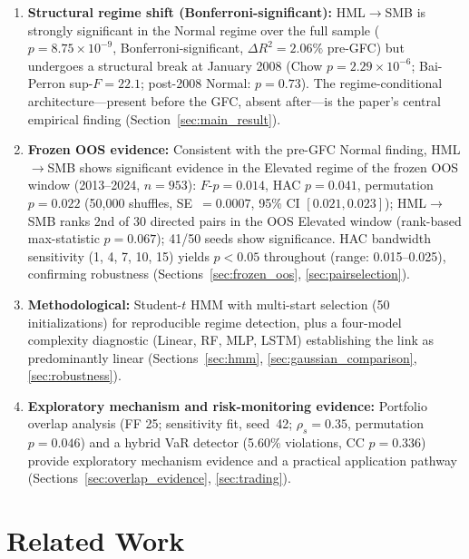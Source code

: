 \documentclass[sigconf,anonymous]{acmart}
\begin{document}
\begin{enumerate}
    \item \textbf{Structural regime shift (Bonferroni-significant):}
    HML$\to$SMB is strongly significant in the Normal regime over the full sample
    ($p = 8.75 \times 10^{-9}$, Bonferroni-significant, $\Delta R^2 = 2.06\%$ pre-GFC)
    but undergoes a structural break at January 2008 (Chow $p = 2.29\times10^{-6}$;
    Bai-Perron sup-$F = 22.1$; post-2008 Normal: $p = 0.73$).
    The regime-conditional architecture---present before the GFC, absent after---is
    the paper's central empirical finding
    (Section~\ref{sec:main_result}).

    \item \textbf{Frozen OOS evidence:} Consistent with the pre-GFC Normal finding,
    HML$\to$SMB shows significant evidence in the Elevated regime of the frozen
    OOS window (2013--2024, $n = 953$): $F$-$p = 0.014$, HAC $p = 0.041$,
    permutation $p = 0.022$ (50{,}000 shuffles, SE~$= 0.0007$, 95\% CI $[0.021, 0.023]$);
    HML$\to$SMB ranks 2nd of 30 directed pairs in the OOS Elevated window
    (rank-based max-statistic $p = 0.067$); 41/50 seeds show significance.
    HAC bandwidth sensitivity (1, 4, 7, 10, 15) yields $p < 0.05$ throughout
    (range: 0.015--0.025), confirming robustness
    (Sections~\ref{sec:frozen_oos}, \ref{sec:pairselection}).

    \item \textbf{Methodological:} Student-$t$ HMM with multi-start selection
    (50 initializations) for reproducible regime detection, plus a four-model
    complexity diagnostic (Linear, RF, MLP, LSTM) establishing the link as
    predominantly linear
    (Sections~\ref{sec:hmm}, \ref{sec:gaussian_comparison}, \ref{sec:robustness}).

    \item \textbf{Exploratory mechanism and risk-monitoring evidence:}
    Portfolio overlap analysis (FF 25; sensitivity fit, seed~42;
    $\rho_s = 0.35$, permutation $p = 0.046$) and a hybrid VaR detector
    (5.60\% violations, CC $p = 0.336$) provide exploratory mechanism evidence
    and a practical application pathway
    (Sections~\ref{sec:overlap_evidence}, \ref{sec:trading}).
\end{enumerate}

\section{Related Work}
\end{document}
